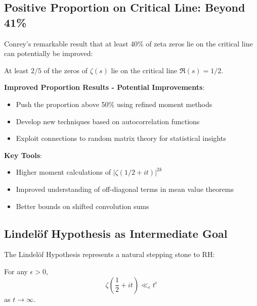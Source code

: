 \subsection{Positive Proportion on Critical Line: Beyond 41\%}
\label{subsec:positive_proportion}

Conrey's remarkable result that at least 40\% of zeta zeros lie on the critical line can potentially be improved:

\begin{theorem}[Conrey 1989]
At least $2/5$ of the zeros of $\zeta(s)$ lie on the critical line $\Re(s) = 1/2$.
\end{theorem}

\noindent\textbf{Improved Proportion Results - Potential Improvements}:
\begin{itemize}
\item Push the proportion above 50\% using refined moment methods
\item Develop new techniques based on autocorrelation functions
\item Exploit connections to random matrix theory for statistical insights
\end{itemize}

\textbf{Key Tools}:
\begin{itemize}
\item Higher moment calculations of $|\zeta(1/2 + it)|^{2k}$
\item Improved understanding of off-diagonal terms in mean value theorems
\item Better bounds on shifted convolution sums
\end{itemize}

\subsection{Lindelöf Hypothesis as Intermediate Goal}
\label{subsec:lindelof_intermediate}

The Lindelöf Hypothesis represents a natural stepping stone to RH:

\begin{conjecture}
For any $\epsilon > 0$,
\begin{equation}
\zeta\left(\frac{1}{2} + it\right) \ll_\epsilon t^\epsilon
\end{equation}
as $t \to \infty$.
\end{conjecture}

